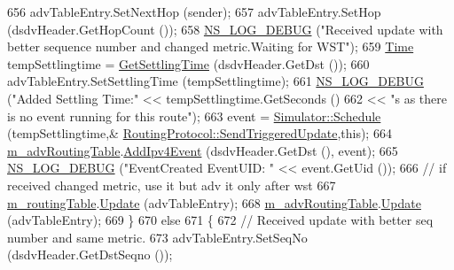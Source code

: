 \begin{DoxyCode}
656                       advTableEntry.SetNextHop (sender);
657                       advTableEntry.SetHop (dsdvHeader.GetHopCount ());
658                       \hyperlink{group__logging_ga413f1886406d49f59a6a0a89b77b4d0a}{NS\_LOG\_DEBUG} (\textcolor{stringliteral}{"Received update with better sequence number and changed
       metric.Waiting for WST"});
659                       \hyperlink{namespacens3_1_1TracedValueCallback_a7ffd3e7c142ffe7c8a1d2db9b8de38ec}{Time} tempSettlingtime = \hyperlink{classns3_1_1dsdv_1_1RoutingProtocol_a83244927636fd12b775ebdbe0b334e68}{GetSettlingTime} (dsdvHeader.GetDst ());
660                       advTableEntry.SetSettlingTime (tempSettlingtime);
661                       \hyperlink{group__logging_ga413f1886406d49f59a6a0a89b77b4d0a}{NS\_LOG\_DEBUG} (\textcolor{stringliteral}{"Added Settling Time:"} << tempSettlingtime.GetSeconds ()
662                                                            << \textcolor{stringliteral}{"s as there is no event running for this
       route"});
663                       \textcolor{keyword}{event} = \hyperlink{classns3_1_1Simulator_a671882c894a08af4a5e91181bf1eec13}{Simulator::Schedule} (tempSettlingtime,&
      \hyperlink{classns3_1_1dsdv_1_1RoutingProtocol_adc414310ddaa5e69520a176c0dac59cc}{RoutingProtocol::SendTriggeredUpdate},\textcolor{keyword}{this});
664                       \hyperlink{classns3_1_1dsdv_1_1RoutingProtocol_adce3cf63777d6099e58caa1cb198282c}{m\_advRoutingTable}.\hyperlink{classns3_1_1dsdv_1_1RoutingTable_aa9757950491f7aba7c1db83b2d62df67}{AddIpv4Event} (dsdvHeader.GetDst (),
      event);
665                       \hyperlink{group__logging_ga413f1886406d49f59a6a0a89b77b4d0a}{NS\_LOG\_DEBUG} (\textcolor{stringliteral}{"EventCreated EventUID: "} << event.GetUid ());
666                       \textcolor{comment}{// if received changed metric, use it but adv it only after wst}
667                       \hyperlink{classns3_1_1dsdv_1_1RoutingProtocol_acc4cee466c2591e35f508ce58097a00e}{m\_routingTable}.\hyperlink{classns3_1_1dsdv_1_1RoutingTable_a651762730975f809c720313b1332cb99}{Update} (advTableEntry);
668                       \hyperlink{classns3_1_1dsdv_1_1RoutingProtocol_adce3cf63777d6099e58caa1cb198282c}{m\_advRoutingTable}.\hyperlink{classns3_1_1dsdv_1_1RoutingTable_a651762730975f809c720313b1332cb99}{Update} (advTableEntry);
669                     \}
670                   \textcolor{keywordflow}{else}
671                     \{
672                       \textcolor{comment}{// Received update with better seq number and same metric.}
673                       advTableEntry.SetSeqNo (dsdvHeader.GetDstSeqno ());

\end{DoxyCode}
